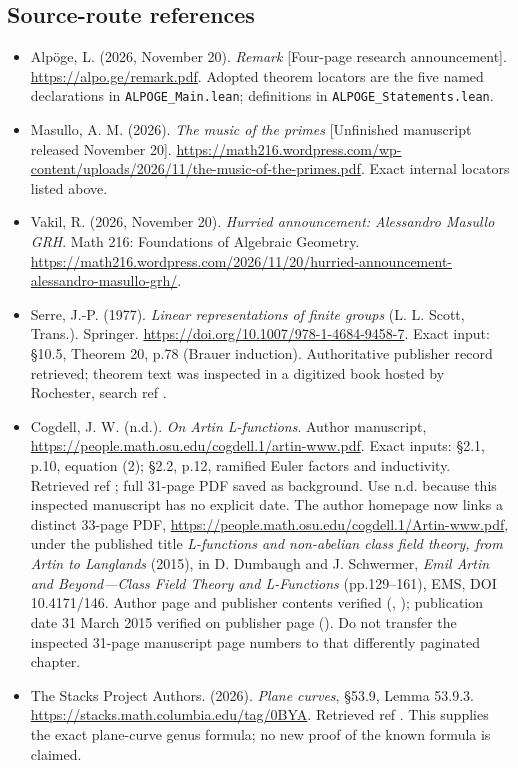 \documentclass[11pt,a4paper]{article}
\providecommand{\tightlist}{\setlength{\itemsep}{0pt}\setlength{\parskip}{0pt}}
\theoremstyle{definition}\newtheorem{definition}[theorem]{Definition}
\theoremstyle{remark}\newtheorem{remark}[theorem]{Remark}
\begin{document}
\subsection{Source-route references}\label{source-route-references}

\begin{itemize}
\tightlist
\item
  Alpöge, L. (2026, November 20). \emph{Remark} {[}Four-page research
  announcement{]}. \url{https://alpo.ge/remark.pdf}. Adopted theorem
  locators are the five named declarations in
  \nolinkurl{ALPOGE_Main.lean}; definitions in
  \nolinkurl{ALPOGE_Statements.lean}.
\item
  Masullo, A. M. (2026). \emph{The music of the primes} {[}Unfinished
  manuscript released November 20{]}.
  \url{https://math216.wordpress.com/wp-content/uploads/2026/11/the-music-of-the-primes.pdf}.
  Exact internal locators listed above.
\item
  Vakil, R. (2026, November 20). \emph{Hurried announcement: Alessandro
  Masullo GRH}. Math 216: Foundations of Algebraic Geometry.
  \url{https://math216.wordpress.com/2026/11/20/hurried-announcement-alessandro-masullo-grh/}.
\item
  Serre, J.-P. (1977). \emph{Linear representations of finite groups}
  (L. L. Scott, Trans.). Springer.
  \url{https://doi.org/10.1007/978-1-4684-9458-7}. Exact input: §10.5,
  Theorem 20, p.78 (Brauer induction). Authoritative publisher record
  retrieved; theorem text was inspected in a digitized book hosted by
  Rochester, search ref \nolinkurl{}.
\item
  Cogdell, J. W. (n.d.). \emph{On Artin L-functions}. Author manuscript,
  \url{https://people.math.osu.edu/cogdell.1/artin-www.pdf}. Exact
  inputs: §2.1, p.10, equation (2); §2.2, p.12, ramified Euler factors
  and inductivity. Retrieved ref \nolinkurl{}; full
  31-page PDF saved as background. Use n.d. because this inspected
  manuscript has no explicit date. The author homepage now links a
  distinct 33-page PDF,
  \url{https://people.math.osu.edu/cogdell.1/Artin-www.pdf}, under the
  published title \emph{L-functions and non-abelian class field theory,
  from Artin to Langlands} (2015), in D. Dumbaugh and J. Schwermer,
  \emph{Emil Artin and Beyond---Class Field Theory and L-Functions}
  (pp.129--161), EMS, DOI 10.4171/146. Author page and publisher
  contents verified (\nolinkurl{},
  \nolinkurl{}); publication date 31 March 2015
  verified on publisher page (\nolinkurl{}). Do not
  transfer the inspected 31-page manuscript page numbers to that
  differently paginated chapter.
\item
  The Stacks Project Authors. (2026). \emph{Plane curves}, §53.9, Lemma
  53.9.3. \url{https://stacks.math.columbia.edu/tag/0BYA}. Retrieved ref
  \nolinkurl{}. This supplies the exact plane-curve genus
  formula; no new proof of the known formula is claimed.
\end{itemize}
\end{document}
